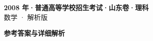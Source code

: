 \documentclass[zihao=-4, a4paper]{ctexart}
\begin{document}
\begin{center}
  {\Large\bfseries 2008 年·普通高等学校招生考试·山东卷·理科}\\[4pt]
  {\large 数学 · 解析版}
\end{center}
\medskip
{}

\clearpage
{}
\begin{center}{\Large\bfseries 参考答案与详细解析}\end{center}
\medskip

\end{document}
